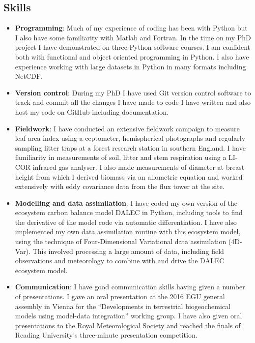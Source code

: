\documentclass[11pt]{article}
\begin{document}
\subsection*{Skills}
\begin{itemize}
\item \textbf{Programming}: Much of my experience of coding has been with Python but I also have some familiarity with Matlab and Fortran. In the time on my PhD project I have demonstrated on three Python software courses. I am confident both with functional and object oriented programming in Python. I also have experience working with large datasets in Python in many formats including NetCDF. 
\item \textbf{Version control}: During my PhD I have used Git version control software to track and commit all the changes I have made to code I have written and also host my code on GitHub including documentation. 
\item \textbf{Fieldwork}: I have conducted an extensive fieldwork campaign to measure leaf area index using a ceptometer, hemispherical photographs and regularly sampling litter traps at a forest research station in southern England. I have familiarity in measurements of soil, litter and stem respiration using a LI-COR infrared gas analyser. I also made measurements of diameter at breast height from which I derived biomass via an allometric equation and worked extensively with eddy covariance data from the flux tower at the site. 
\item \textbf{Modelling and data assimilation}: I have coded my own version of the ecosystem carbon balance model DALEC in Python, including tools to find the derivative of the model code via automatic differentiation. I have also implemented my own data assimilation routine with this ecosystem model, using the technique of Four-Dimensional Variational data assimilation (4D-Var). This involved processing a large amount of data, including field observations and meteorology to combine with and drive the DALEC ecosystem model.
\item \textbf{Communication}: I have good communication skills having given a number of presentations. I gave an oral presentation at the 2016 EGU general assembly in Vienna for the ``Developments in terrestrial biogeochemical models using model-data integration'' working group. I have also given oral presentations to the Royal Meteorological Society and reached the finals of Reading University's three-minute presentation competition.
\end{itemize}
\end{document}
